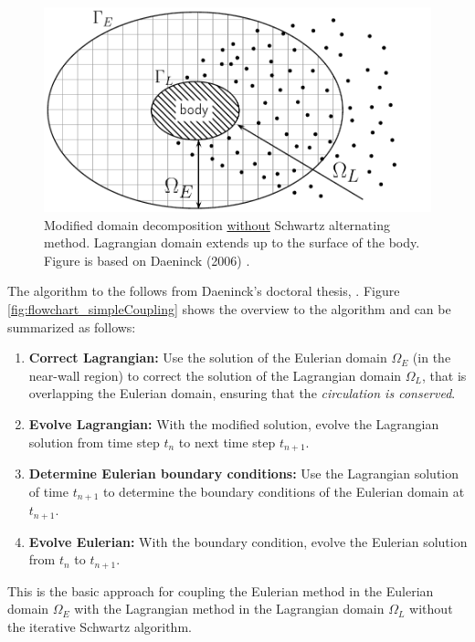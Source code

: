 	\begin{figure}[!t]
		\centering
		\includegraphics[width=0.6\linewidth]{figures/introduction/domainDecomposition_daenick_type2.pdf}
		\caption{Modified domain decomposition \underline{without} Schwartz alternating method. Lagrangian domain extends up to the surface of the body. Figure is based on Daeninck (2006) \cite{Daeninck2006}.}
		\label{fig:domainDecomposition_daenick}
	\end{figure}

The algorithm to the  follows from Daeninck's doctoral thesis, \cite{Daeninck2006}. Figure \ref{fig:flowchart_simpleCoupling} shows the overview to the algorithm and can be summarized as follows:

	\begin{enumerate}
	\item \textbf{Correct Lagrangian:} Use the solution of the Eulerian domain $\Omega_E$ (in the near-wall region) to correct the solution of the Lagrangian domain $\Omega_L$, that is overlapping the Eulerian domain, ensuring that the \textit{circulation is conserved}.  
	
	\item \textbf{Evolve Lagrangian:} With the modified solution, evolve the Lagrangian solution from time step $t_n$ to next time step $t_{n+1}$.
	
	\item \textbf{Determine Eulerian boundary conditions:} Use the Lagrangian solution of time $t_{n+1}$ to determine the boundary conditions of the Eulerian domain at $t_{n+1}$.
	
	\item \textbf{Evolve Eulerian:} With the boundary condition, evolve the Eulerian solution from $t_n$ to $t_{n+1}$.
	\end{enumerate}
	
This is the basic approach for coupling the Eulerian method in the Eulerian domain $\Omega_E$ with the Lagrangian method in the Lagrangian domain $\Omega_L$ without the iterative Schwartz algorithm. 

